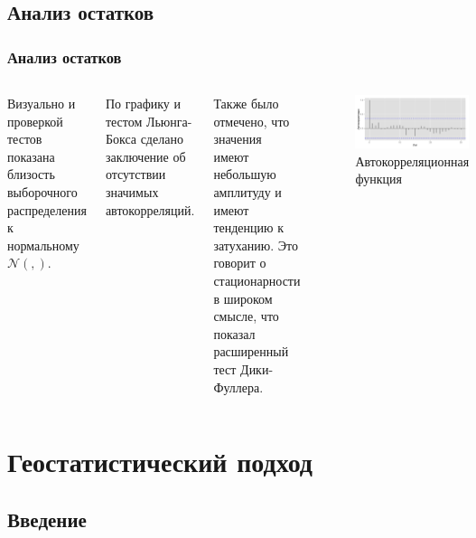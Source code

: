 \documentclass[10pt,pdf,aspectratio=169,hyperref={unicode}]{beamer}
\newcommand{\inp}[1]{}
\newcommand{\descriptive}[2]{\inp{#1/descriptive/#2}}
\newcommand{\resnormaldistr}{$\mathcal{N}(\descriptive{residual}{mean}, \descriptive{residual}{variance})$}
\begin{document}
\subsection{Анализ остатков}
\begin{frame}
  \frametitle{Анализ остатков}
  \begin{columns}[c]
  \column{2.5in}
    Визуально и проверкой тестов показана близость выборочного распределения к нормальному \resnormaldistr.

    \vspace{0.5em}

    По графику и тестом Льюнга-Бокса сделано заключение об отсутствии значимых автокорреляций.

    \vspace{0.5em}

    Также было отмечено, что значения имеют небольшую амплитуду и имеют тенденцию к затуханию. Это говорит о стационарности в широком смысле, что показал расширенный тест Дики-Фуллера.
  \column{3.5in}
    \begin{figure}[h]
    \includegraphics[width=1\linewidth]{../../figures/residual/acf.png}
    \caption{Автокорреляционная функция}
  \end{figure}
  \end{columns}
\end{frame}

\section{Геостатистический подход}

\subsection{Введение}
\end{document}
